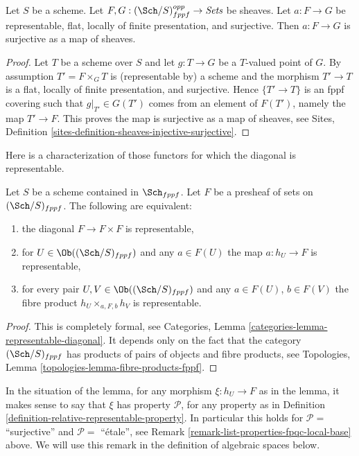 \begin{lemma}
\label{lemma-surjective-flat-locally-finite-presentation}
Let $S$ be a scheme.
Let $F, G : (\Sch/S)_{fppf}^{opp} \to \textit{Sets}$ be sheaves.
Let $a : F \to G$ be representable, flat,
locally of finite presentation, and surjective.
Then $a : F \to G$ is surjective as a map of sheaves.
\end{lemma}

\begin{proof}
Let $T$ be a scheme over $S$ and let $g : T \to G$ be a $T$-valued point of
$G$. By assumption $T' = F \times_G T$ is (representable by) a scheme and
the morphism $T' \to T$ is a flat, locally of finite presentation, and
surjective. Hence $\{T' \to T\}$ is an fppf covering such
that $g|_{T'} \in G(T')$ comes from an element of $F(T')$, namely
the map $T' \to F$. This proves the map is surjective as
a map of sheaves, see
Sites, Definition \ref{sites-definition-sheaves-injective-surjective}.
\end{proof}

\noindent
Here is a characterization of those functors for which the
diagonal is representable.

\begin{lemma}
\label{lemma-representable-diagonal}
Let $S$ be a scheme contained in $\Sch_{fppf}$.
Let $F$ be a presheaf of sets on $(\Sch/S)_{fppf}$.
The following are equivalent:
\begin{enumerate}
\item the diagonal $F \to F \times F$ is representable,
\item for $U \in \Ob((\Sch/S)_{fppf})$ and any $a \in F(U)$
the map $a : h_U \to F$ is representable,
\item for every pair $U, V \in \Ob((\Sch/S)_{fppf})$
and any $a \in F(U)$, $b \in F(V)$ the fibre product
$h_U \times_{a, F, b} h_V$ is representable.
\end{enumerate}
\end{lemma}

\begin{proof}
This is completely formal, see
Categories, Lemma \ref{categories-lemma-representable-diagonal}.
It depends only on the fact that the category $(\Sch/S)_{fppf}$
has products of pairs of objects and fibre products, see
Topologies, Lemma \ref{topologies-lemma-fibre-products-fppf}.
\end{proof}

\noindent
In the situation of the lemma, for any morphism
$\xi : h_U \to F$ as in the lemma, it makes sense
to say that $\xi$ has property $\mathcal{P}$, for any property
as in Definition \ref{definition-relative-representable-property}.
In particular this holds for $\mathcal{P} = $ ``surjective''
and $\mathcal{P} = $ ``\'etale'', see
Remark \ref{remark-list-properties-fpqc-local-base}
above. We will use this remark in the definition
of algebraic spaces below.

